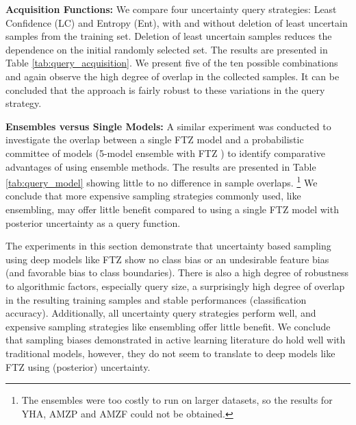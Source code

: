 \documentclass[11pt,a4paper]{article}
\begin{document}
\textbf{Acquisition Functions:} We compare four uncertainty query strategies: Least Confidence (LC) and Entropy (Ent), with and without deletion of least uncertain samples from the training set. Deletion of least uncertain samples reduces the dependence on the initial randomly selected set. The results are presented in Table \ref{tab:query_acquisition}. We present five of the ten possible combinations and again observe the high degree of overlap in the collected samples. It can be concluded that the approach is fairly robust to these variations in the query strategy.

\textbf{Ensembles versus Single Models:} A similar experiment was conducted to investigate the overlap between a single FTZ model and a probabilistic committee of models (5-model ensemble with FTZ \cite{lakshminarayanan2017simple}) to identify comparative advantages of  using ensemble methods. The results are presented in Table \ref{tab:query_model} showing little to no difference in sample overlaps. \footnote{The ensembles were too costly to run on larger datasets, so the results for YHA, AMZP and AMZF could not be obtained.} We conclude that more expensive sampling strategies commonly used, like ensembling, may offer little benefit compared to using a single FTZ model with posterior uncertainty as a query function.

 The experiments in this section demonstrate that uncertainty based sampling using deep models like FTZ show no class bias or an undesirable feature bias (and favorable bias to class boundaries). There is also a high degree of robustness to algorithmic factors, especially query size, a surprisingly high degree of overlap in the resulting training samples and stable performances (classification accuracy). Additionally, all uncertainty query strategies perform well, and expensive sampling strategies like ensembling offer little benefit. We conclude that sampling biases demonstrated in active learning literature do hold well with traditional models, however, they do not seem to translate to deep models like FTZ using (posterior) uncertainty.
\end{document}
